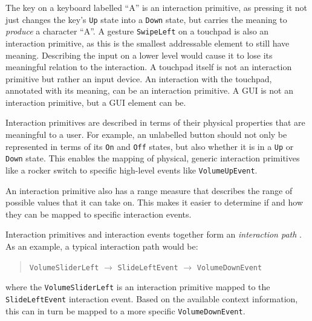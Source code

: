 The key on a keyboard labelled ``A'' is an interaction primitive, as pressing it not just changes the key's \texttt{Up} state into a \texttt{Down} state, but carries the meaning to \emph{produce} a character ``A''. A gesture \texttt{SwipeLeft} on a touchpad is also an interaction primitive, as this is the smallest addressable element to still have meaning. Describing the input on a lower level would cause it to lose its meaningful relation to the interaction. A touchpad itself is not an interaction primitive but rather an input device. An interaction with the touchpad, annotated with its meaning, can be an interaction primitive. A \ac{GUI} is not an interaction primitive, but a \ac{GUI} element can be.

Interaction primitives are described in terms of their physical properties that are meaningful to a user. For example, an unlabelled button should not only be represented in terms of its \texttt{On} and \texttt{Off} states, but also whether it is in a \texttt{Up} or \texttt{Down} state. This enables the mapping of physical, generic interaction primitives like a rocker switch to specific high-level events like \texttt{VolumeUpEvent}.

An interaction primitive also has a range measure that describes the range of possible values that it can take on. This makes it easier to determine if and how they can be mapped to specific interaction events.

Interaction primitives and interaction events together form an \emph{interaction path} \cite{Dubois2008}. As an example, a typical interaction path would be:
\label{interactionPath}

\begin{quote}\noindent
\texttt{VolumeSliderLeft} $\rightarrow$ \texttt{SlideLeftEvent} $\rightarrow$ \texttt{VolumeDownEvent}
\end{quote}

where the \texttt{VolumeSliderLeft} is an interaction primitive map\-ped to the \texttt{SlideLeftEvent} interaction event. Based on the available context information, this can in turn be mapped to a more specific \texttt{Volume\-Down\-Event}.



